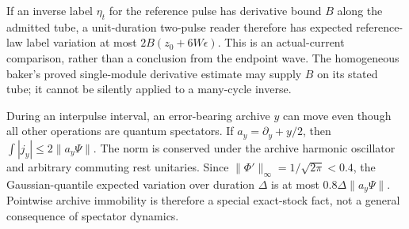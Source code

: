 \documentclass[11pt]{article}
\numberwithin{equation}{section}
\theoremstyle{definition}
\theoremstyle{remark}
\begin{document}
If an inverse label $\eta_t$ for the reference pulse has derivative bound
$B$ along the admitted tube, a unit-duration two-pulse reader therefore
has expected reference-law label variation at most
$2B(z_0+6W\epsilon)$. This is an actual-current comparison, rather than
a conclusion from the endpoint wave. The homogeneous baker's proved
single-module derivative estimate may supply $B$ on its stated tube;
it cannot be silently applied to a many-cycle inverse.

During an interpulse interval, an error-bearing archive $y$ can move even
though all other operations are quantum spectators. If
$a_y=\partial_y+y/2$, then $\int|j_y|\leq2\|a_y\Psi\|$.
The norm is conserved under the archive harmonic oscillator and arbitrary
commuting rest unitaries. Since $\|\Phi'\|_\infty=1/\sqrt{2\pi}<0.4$,
the Gaussian-quantile expected variation over duration $\Delta$ is at most
$0.8\Delta\|a_y\Psi\|$. Pointwise archive immobility is therefore a
special exact-stock fact, not a general consequence of spectator dynamics.
\end{document}
